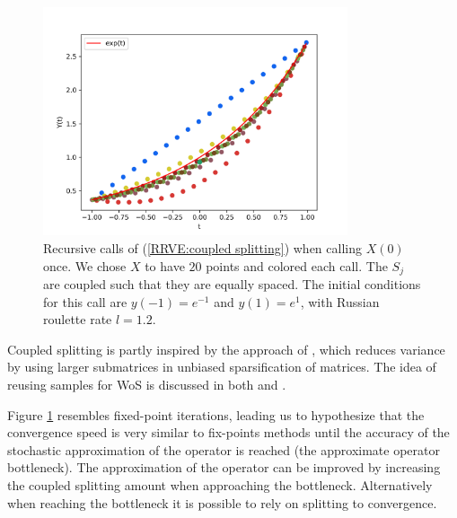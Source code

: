 \documentclass[a4paper,12pt]{article}
\begin{document}
\begin{figure}[h!]
    \centering
    \includegraphics[width=0.8\textwidth]{plots/coupled split.png}
    \caption{Recursive calls of (\ref{RRVE:coupled splitting}) when
    calling $X(0)$ once. We chose $X$ to have $20$ points and
    colored each call. The $S_{j}$ are coupled such that
    they are equally spaced.
    The initial conditions for this call are $y(-1)=e^{-1}$ and $y(1)=e^{1}$,
    with Russian roulette rate $l=1.2$. }
    \label{fig:coupled splitting}
\end{figure}



\begin{related}
    Coupled splitting is partly inspired by the approach
    of \cite{sabelfeld_sparsified_2009}, which reduces
    variance by using larger submatrices in unbiased sparsification
    of matrices. The idea
    of reusing samples for WoS is discussed in both
    \cite{miller_boundary_2023} and \cite{bakbouk_mean_2023}.
\end{related}

Figure \ref{fig:coupled splitting}
resembles fixed-point iterations, leading us to hypothesize
that the convergence
speed is very similar to fix-points methods until the accuracy
of the stochastic approximation of the operator is reached
(the approximate operator bottleneck). The approximation of the operator
can be improved by increasing the coupled splitting amount when
approaching the bottleneck. Alternatively when reaching
the bottleneck it is possible to rely on splitting to convergence.
\end{document}
